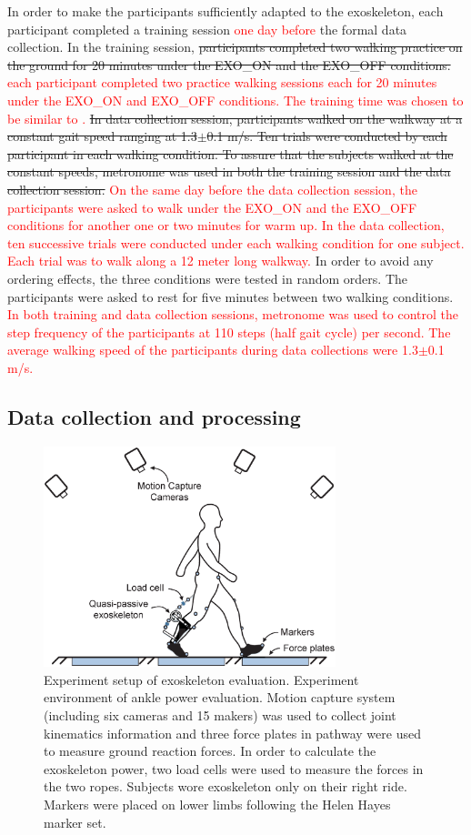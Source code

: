 \documentclass[twocolumn,cleanfoot,10pt]{asme2ej}
\begin{document}
In order to make the participants sufficiently adapted to the exoskeleton, each participant completed a training session \textcolor{red}{one day before} the formal data collection. In the training session, \sout{participants completed two walking practice on the ground for 20 minutes under the EXO\_ON and the EXO\_OFF conditions.} \textcolor{red}{each participant completed two practice walking sessions each for 20 minutes under the EXO\_ON and EXO\_OFF conditions. The training time was chosen to be similar to \cite{RN5}.} \sout{In data collection session, participants walked on the walkway at a constant gait speed ranging at 1.3$\pm$0.1 m/s. Ten trials were conducted by each participant in each walking condition.	To assure that the subjects walked at the constant speeds, metronome was used in both the training session and the data collection session.} \textcolor{red}{On the same day before the data collection session, the participants were asked to walk under the EXO\_ON and the EXO\_OFF conditions for another one or two minutes for warm up. In the data collection, ten successive trials were conducted under each walking condition for one subject. Each trial was to walk along a 12 meter long walkway.} In order to avoid any ordering effects, the three conditions were tested in random orders. The participants were asked to rest for five minutes between two walking conditions.
\textcolor{red}{In both training and data collection sessions, metronome was used to control the step frequency of the participants at 110 steps (half gait cycle) per second.
The average walking speed of the participants during data collections were 1.3$\pm$0.1 m/s.}

\subsection{Data collection and processing}

\begin{figure}[bt]
	\centering
	\includegraphics[width=8.5cm]{environment.eps}
	\caption{Experiment setup of exoskeleton evaluation. Experiment environment of ankle power evaluation. Motion capture system (including six  cameras and 15 makers) was used to collect joint kinematics information and three force plates in pathway were used to measure ground reaction forces. In order to calculate the exoskeleton power, two load cells were used to measure the forces in the two ropes. Subjects wore exoskeleton only on their right ride. Markers were placed on lower limbs following the Helen Hayes marker set.}
	\label{fig:Environment}
\end{figure}
\end{document}
